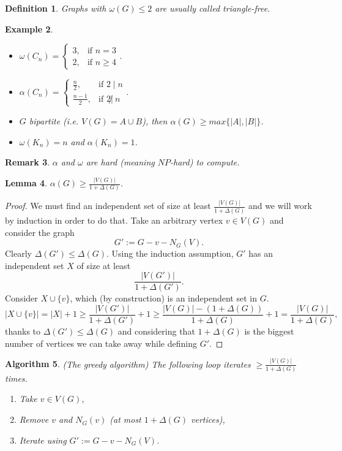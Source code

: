 \documentclass[a4paper]{article}
\theoremstyle{plain}
\newtheorem{lemma}{Lemma}
\newtheorem{definition}[lemma]{Definition}
\theoremstyle{myremark}
\newtheorem{remark}[lemma]{Remark}
\newtheorem{example}[lemma]{Example}
\newtheorem{algorithm}[lemma]{Algorithm}
\begin{document}
\begin{definition} Graphs with $\omega(G)\leqslant 2$ are usually called triangle-free.
\end{definition}

\begin{example}
\begin{itemize}
\item $\omega(C_n)=
\begin{cases} 
3, & \text{if } n=3\\ 
2, & \text{if } n\geqslant 4
\end{cases}.$
\item $\alpha(C_n)=
\begin{cases} 
\frac{n}{2}, & \text{if } 2\mid n\\ 
\frac{n-1}{2}, & \text{if } 2\not| \ n
\end{cases}.$
\item $G$ bipartite (i.e. $V(G)=A\cup B$), then $\alpha(G)\geqslant max\{|A|,|B|\}$.
\item $\omega(K_n)=n$ and $\alpha(K_n)=1$.
\end{itemize}
\end{example}

\begin{remark} $\alpha$ and $\omega$ are hard (meaning $NP$-hard) to compute.
\end{remark}

\begin{lemma}
$\alpha(G)\geqslant \frac{|V(G)|}{1+\Delta(G)}$.
\end{lemma}

\begin{proof} We must find an independent set of size at least $\frac{|V(G)|}{1+\Delta(G)}$ and we will work by induction in order to do that. Take an arbitrary vertex $v\in V(G)$ and consider the graph 
$$G':=G-v-N_G(V).$$
Clearly $\Delta(G')\leqslant \Delta(G)$. Using the induction assumption, $G'$ has an independent set $X$ of size at least
$$\frac{|V(G')|}{1+\Delta(G')}.$$
Consider $X\cup \{v\}$, which (by construction) is an independent set in $G$.
$$|X\cup \{v\}|=|X|+1\geqslant\frac{|V(G')|}{1+\Delta(G')}+1\geqslant \frac{|V(G)|-(1+\Delta(G))}{1+\Delta(G)}+1=\frac{|V(G)|}{1+\Delta(G)},$$
thanks to $\Delta(G')\leqslant \Delta(G)$ and considering that $1+\Delta(G)$ is the biggest number of vertices we can take away while defining $G'$.
\end{proof}

\begin{algorithm} (The greedy algorithm) The following loop iterates $\geqslant \frac{|V(G)|}{1+\Delta(G)}$ times.
\begin{enumerate}
\item Take $v\in V(G)$,
\item Remove $v$ and $N_G(v)$ (at most $1+\Delta(G)$ vertices),
\item Iterate using $G':=G-v-N_G(V)$.
\end{enumerate}
\end{algorithm}
\end{document}
